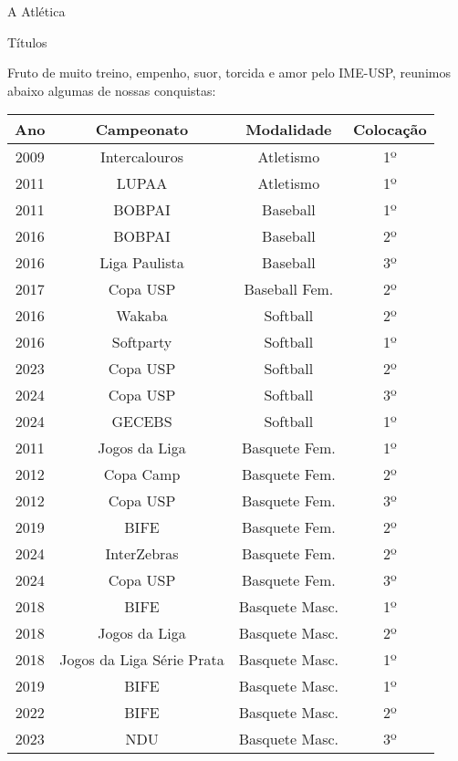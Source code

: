 \begin{secao}{A Atlética}
\begin{subsecao}{Títulos}

Fruto de muito treino, empenho, suor, torcida e amor pelo IME-USP, reunimos
abaixo algumas de nossas conquistas:

\begin{center}
  \begin{tabular}{|c|c|c|c|}
    \hline
    Ano & Campeonato & Modalidade & Colocação\\
    \hline
    2009 & Intercalouros  & Atletismo       & 1º\\
    2011 & LUPAA          & Atletismo       & 1º\\
    2011 & BOBPAI         & Baseball        & 1º\\
    2016 & BOBPAI         & Baseball        & 2º\\
    2016 & Liga Paulista  & Baseball        & 3º\\
    2017 & Copa USP       & Baseball Fem.   & 2º\\
    2016 & Wakaba         & Softball        & 2º\\
    2016 & Softparty      & Softball        & 1º\\
    2023 & Copa USP       & Softball        & 2º\\
    2024 & Copa USP       & Softball        & 3º\\
    2024 & GECEBS         & Softball        & 1º\\
    2011 & Jogos da Liga  & Basquete Fem.   & 1º\\
    2012 & Copa Camp      & Basquete Fem.   & 2º\\
    2012 & Copa USP       & Basquete Fem.   & 3º\\
    2019 & BIFE           & Basquete Fem.   & 2º\\
    2024 & InterZebras    & Basquete Fem.   & 2º\\
    2024 & Copa USP       & Basquete Fem.   & 3º\\
    2018 & BIFE           & Basquete Masc.  & 1º\\
    2018 & Jogos da Liga  & Basquete Masc.  & 2º\\
    2018 & Jogos da Liga Série Prata & Basquete Masc. & 1º\\
    2019 & BIFE           & Basquete Masc.  & 1º\\
    2022 & BIFE           & Basquete Masc.  & 2º\\
    2023 & NDU            & Basquete Masc.  & 3º\\

\end{tabular}
\end{center}
\end{subsecao}
\end{secao}
